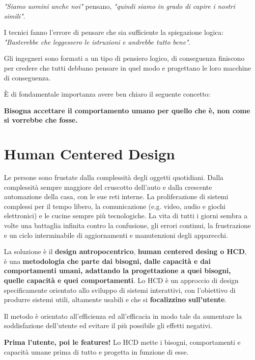 \documentclass[a4paper,11pt,oneside]{book}
\begin{document}
\textit{"Siamo uomini anche noi"} pensano, \textit{"quindi siamo in grado di capire i nostri simili"}.

I tecnici fanno l'errore di pensare che sia sufficiente la spiegazione logica: \textit{"Basterebbe che leggessero le istruzioni e andrebbe tutto bene"}.

Gli ingegneri sono formati a un tipo di pensiero logico, di conseguenza finiscono per credere che tutti debbano pensare in quel modo e progettano le loro macchine di conseguenza.

È di fondamentale importanza avere ben chiaro il seguente concetto:

\begin{center}
	\textbf{\LARGE Bisogna accettare il comportamento umano per quello che è, non come si vorrebbe che fosse.}
\end{center}

\pagebreak


\chapter{Human Centered Design}
Le persone sono frustate dalla complessità degli oggetti quotidiani. Dalla complessità sempre maggiore del cruscotto dell'auto e dalla crescente automazione della casa, con le sue reti interne. La proliferazione di sistemi complessi per il tempo libero, la comunicazione (e.g. video, audio e giochi elettronici) e le cucine sempre più tecnologiche. La vita di tutti i giorni sembra a volte una battaglia infinita contro la confusione, gli errori continui, la frustrazione e un ciclo interminabile di aggiornamenti e manutenzioni degli apparecchi.

La soluzione è il \textbf{design antropocentrico}, \textbf{human centered desing o HCD}, è una \textbf{metodologia che parte dai bisogni, dalle capacità e dai comportamenti umani, adattando la progettazione a quei bisogni, quelle capacità e quei comportamenti}. Lo HCD è un approccio di design specificamente orientato allo sviluppo di sistemi interattivi, con l'obiettivo di produrre sistemi utili, altamente usabili e che si \textbf{focalizzino sull'utente}.

Il metodo è orientato all'efficienza ed all'efficacia in modo tale da aumentare la soddisfazione dell'utente ed evitare il più possibile gli effetti negativi.

\textbf{Prima l'utente, poi le features!} Lo HCD mette i bisogni, comportamenti e capacità umane prima di tutto e progetta in funzione di esse.
\end{document}
